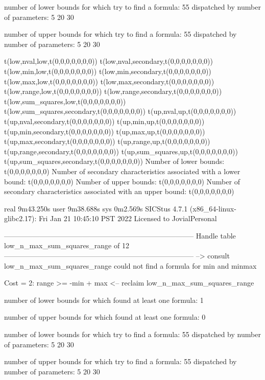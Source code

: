 number of lower bounds for which try to find a formula: 55
dispatched by number of parameters: 5  20  30

number of upper bounds for which try to find a formula: 55
dispatched by number of parameters: 5  20  30

t(low,nval,low,t(0,0,0,0,0,0,0))
t(low,nval,secondary,t(0,0,0,0,0,0,0))
t(low,min,low,t(0,0,0,0,0,0,0))
t(low,min,secondary,t(0,0,0,0,0,0,0))
t(low,max,low,t(0,0,0,0,0,0,0))
t(low,max,secondary,t(0,0,0,0,0,0,0))
t(low,range,low,t(0,0,0,0,0,0,0))
t(low,range,secondary,t(0,0,0,0,0,0,0))
t(low,sum_squares,low,t(0,0,0,0,0,0,0))
t(low,sum_squares,secondary,t(0,0,0,0,0,0,0))
t(up,nval,up,t(0,0,0,0,0,0,0))
t(up,nval,secondary,t(0,0,0,0,0,0,0))
t(up,min,up,t(0,0,0,0,0,0,0))
t(up,min,secondary,t(0,0,0,0,0,0,0))
t(up,max,up,t(0,0,0,0,0,0,0))
t(up,max,secondary,t(0,0,0,0,0,0,0))
t(up,range,up,t(0,0,0,0,0,0,0))
t(up,range,secondary,t(0,0,0,0,0,0,0))
t(up,sum_squares,up,t(0,0,0,0,0,0,0))
t(up,sum_squares,secondary,t(0,0,0,0,0,0,0))
Number of lower bounds:                                             t(0,0,0,0,0,0,0)
Number of secondary characteristics associated with a lower bound:  t(0,0,0,0,0,0,0)
Number of upper bounds:                                             t(0,0,0,0,0,0,0)
Number of secondary characteristics associated with an upper bound: t(0,0,0,0,0,0,0)

real	9m43.250s
user	9m38.688s
sys	0m2.569s
SICStus 4.7.1 (x86_64-linux-glibc2.17): Fri Jan 21 10:45:10 PST 2022
Licensed to JovialPersonal


--------------------------------------------------------------------------------
Handle table low_n_max_sum_squares_range of 12
--------------------------------------------------------------------------------
--> consult low_n_max_sum_squares_range
could not find a formula for min and minmax

Cost =  2:  range >= -min + max
<-- reclaim low_n_max_sum_squares_range

number of lower bounds for which found at least one formula: 1

number of upper bounds for which found at least one formula: 0

number of lower bounds for which try to find a formula: 55
dispatched by number of parameters: 5  20  30

number of upper bounds for which try to find a formula: 55
dispatched by number of parameters: 5  20  30

